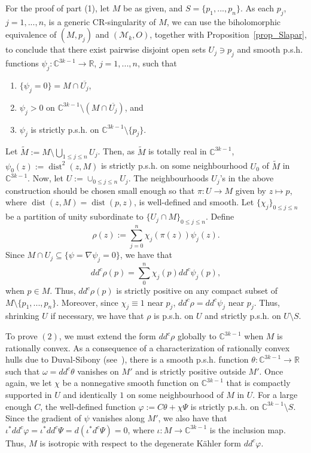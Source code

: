 \documentclass[10pt]{amsart}
\numberwithin{equation}{section}
\theoremstyle{definition}
\theoremstyle{definition}
\theoremstyle{plain}
\newcommand{\bes} {\begin{equation*}}
\newcommand{\ees} {\end{equation*}}
\newcommand{\bc}{\mathcal{M}}
\newcommand{\om}{\omega}
\newcommand{\wt}{\widetilde}
\newcommand{\dist}{\operatorname{dist}}
\newcommand{\C} {\mathbb{C}}
\newcommand{\rl}{\mathbb{R}}
\begin{document}
For the proof of part (1), let $M$ be as given, and $S=\{p_1,...,p_n\}$. As each $p_j$, $j=1,...,n$, is a generic CR-singularity of $M$, we can use the biholomorphic equivalence of $(M, p_j)$ and $(\bc_k,O)$, together with Proposition~\ref{prop_Slapar}, to conclude that there exist pairwise disjoint open sets $U_j\ni p_j$ and smooth p.s.h. functions $\psi_j:\C^{3k-1}\rightarrow\rl$, $j=1,...,n$, such that 
\renewcommand{\theenumi}{\alph{enumi}}
	\begin{enumerate}
		\item $\{\psi_j=0\}=M\cap \overline{U_j}$,
		\item $\psi_j>0$ on $\C^{3k-1}\setminus (M\cap \overline{U_j})$, and
		\item $\psi_j$ is strictly p.s.h. on
			 $\C^{3k-1}\setminus\{p_j\}$. 
	\end{enumerate}
Let $\wt M:=M\setminus \bigcup_{1\leq j\leq n}U_j$. Then, as $\wt M$ is totally real in $\C^{3k-1}$, $\psi_0(z):=\dist^2(z,M)$ is strictly p.s.h. on some neighbourhood $U_0$ of $\wt M$ in $\C^{3k-1}$. Now, let $U:=\cup_{0\leq j\leq n}U_j$. The neighbourhoods $U_j$'s in the above construction should be chosen small enough so that $\pi:U\rightarrow M$ given by $z\mapsto p$, where $\dist(z,M)=\dist(p,z)$, is well-defined and smooth. Let $\{\chi_j\}_{0\leq j\leq n}$ be a partition of unity subordinate to $\{U_j\cap M\}_{0\leq j\leq n}$. Define
	\bes
		\rho(z):=\sum_{j=0}^n \chi_j(\pi(z))\psi_j(z).
	\ees 
Since $M\cap U_j\subseteq\{\psi=\nabla \psi_j=0\}$, we have that
	\bes
		dd^c\rho(p)=\sum_0^n \chi_j(p)dd^c\psi_j(p),
	\ees
when $p\in M$. Thus, $dd^c\rho(p)$ is strictly positive on any compact subset of $M\setminus\{p_1,...,p_n\}$. Moreover, since $\chi_j\equiv 1$ near $p_j$, $dd^c\rho=dd^c\psi_j$ near $p_j$. Thus, shrinking $U$ if necessary, we have that $\rho$ is p.s.h. on $U$ and strictly p.s.h. on $U\setminus S$.

To prove $(2)$,  we must extend the form $dd^c\rho$ globally to $\C^{3k-1}$ when $M$ is rationally convex. As a consequence of a characterization of rationally convex hulls due to Duval-Sibony (see~\cite[Remark~2.2]{DuSi95}), there is a smooth p.s.h. function $\theta:\C^{3k-1}\rightarrow\rl$ such that $\om=dd^c\theta$ vanishes on $M'$ and is strictly positive outside $M'$. Once again, we let $\chi$ be a nonnegative smooth function on $\C^{3k-1}$ that is compactly supported in $U$ and identically $1$ on some neighbourhood of $M$ in $U$. For a large enough $C$, the well-defined function $\varphi:=C\theta+\chi\Psi$ is strictly p.s.h. on $\C^{3k-1}\setminus S$. Since the gradient of $\psi$ vanishes along $M'$, we also have that $\iota^*dd^c\varphi=\iota^*dd^c\Psi=d(\iota^*d^c\Psi)=0$, where $\iota:M\rightarrow \C^{3k-1}$ is the inclusion map. Thus, $M$ is isotropic with respect to the degenerate K{\"a}hler form $dd^c\varphi$. 
\end{document}
